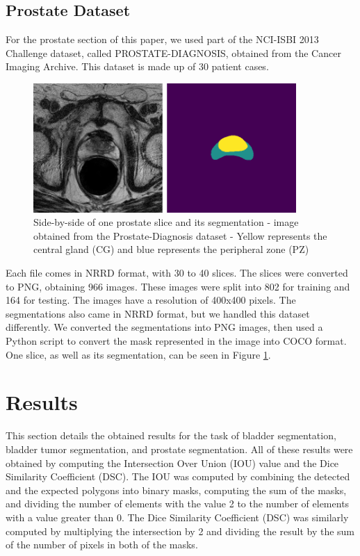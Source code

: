 \documentclass[runningheads,a4paper,11pt]{report}
\begin{document}
\subsection{Prostate Dataset}\label{prostatedata}

For the prostate section of this paper, we used part of the NCI-ISBI 2013 Challenge dataset, called PROSTATE-DIAGNOSIS, obtained from the Cancer Imaging Archive. This dataset is made up of 30 patient cases. 

\begin{figure}[htbp]
	\centerline{\includegraphics[width=10cm]{images/prostate_1.png}}
	\caption{Side-by-side of one prostate slice and its segmentation - image obtained from the Prostate-Diagnosis dataset - Yellow represents the central gland (CG) and blue represents the peripheral zone (PZ)}
	\label{prostate_1}
\end{figure}

Each file comes in NRRD format, with 30 to 40 slices. The slices were converted to PNG, obtaining 966 images. These images were split into 802 for training and 164 for testing. The images have a resolution of 400x400 pixels. The segmentations also came in NRRD format, but we handled this dataset differently. We converted the segmentations into PNG images, then used a Python script to convert the mask represented in the image into COCO format. One slice, as well as its segmentation, can be seen in Figure \ref{prostate_1}.

\section{Results}
\label{section:results}

This section details the obtained results for the task of bladder segmentation, bladder tumor segmentation, and prostate segmentation. All of these results were obtained by computing the Intersection Over Union (IOU) value and the Dice Similarity Coefficient (DSC). The IOU was computed by combining the detected and the expected polygons into binary masks, computing the sum of the masks, and dividing the number of elements with the value 2 to the number of elements with a value greater than 0. The Dice Similarity Coefficient (DSC) was similarly computed by multiplying the intersection by 2 and dividing the result by the sum of the number of pixels in both of the masks.
\end{document}
